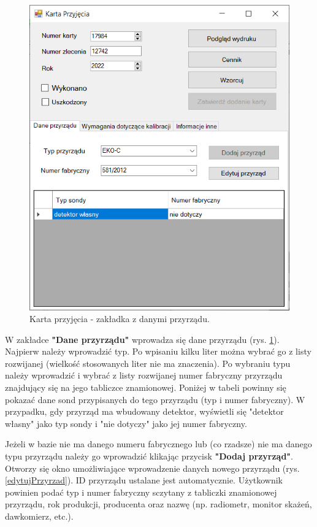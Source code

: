 \begin{figure}[htb]
	\centering
	\includegraphics{obrazki/Biuro/karta/karta_dane_przyrzadu.png}
	\caption{Karta przyjęcia - zakładka z danymi przyrządu.}
	\label{kartaDanePrzyrzadu}
\end{figure}

W zakładce \textbf{"Dane przyrządu"} wprowadza się dane przyrządu (rys. \ref{kartaDanePrzyrzadu}). Najpierw należy wprowadzić typ. Po wpisaniu kilku liter można wybrać go z listy rozwijanej (wielkość stosowanych liter nie ma znaczenia). Po wybraniu typu należy wprowadzić i wybrać z listy rozwijanej numer fabryczny przyrządu znajdujący się na jego tabliczce znamionowej. Poniżej w tabeli powinny się pokazać dane sond przypisanych do tego przyrządu (typ i numer fabryczny). W przypadku, gdy przyrząd ma wbudowany detektor, wyświetli się "detektor własny" jako typ sondy i "nie dotyczy" jako jej numer fabryczny. 

Jeżeli w bazie nie ma danego numeru fabrycznego lub (co rzadsze) nie ma danego typu przyrządu należy go wprowadzić klikając przycisk \textbf{"Dodaj przyrząd"}. Otworzy się okno umożliwiające wprowadzenie danych nowego przyrządu (rys. \ref{edytujPrzyrzad}). ID przyrządu ustalane jest automatycznie. Użytkownik powinien podać typ i numer fabryczny sczytany z tabliczki znamionowej przyrządu, rok produkcji, producenta oraz nazwę (np. radiometr, monitor skażeń, dawkomierz, etc.). 

